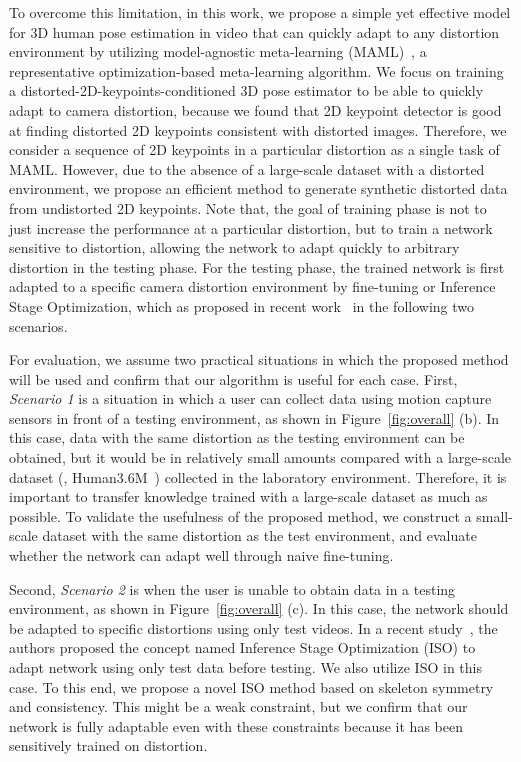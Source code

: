     To overcome this limitation, in this work, we propose a simple yet effective model for 3D human pose estimation in video that can quickly adapt to any distortion environment by utilizing model-agnostic meta-learning (MAML)~\cite{ref20_pmlr-v70-finn17a}, a representative optimization-based meta-learning algorithm. We focus on training a distorted-2D-keypoints-conditioned 3D pose estimator to be able to quickly adapt to camera distortion, because we found that 2D keypoint detector is good at finding distorted 2D keypoints consistent with distorted images. Therefore, we consider a sequence of 2D keypoints in a particular distortion as a single task of MAML. However, due to the absence of a large-scale dataset with a distorted environment, we propose an efficient method to generate synthetic distorted data from undistorted 2D keypoints. Note that, the goal of training phase is not to just increase the performance at a particular distortion, but to train a network sensitive to distortion, allowing the network to adapt quickly to arbitrary distortion in the testing phase. For the testing phase, the trained network is first adapted to a specific camera distortion environment by fine-tuning or Inference Stage Optimization, which as proposed in recent work~\cite{ref18_ISO_NeurIPS2020} in the following two scenarios.

    For evaluation, we assume two practical situations in which the proposed method will be used and confirm that our algorithm is useful for each case. First, \textit{Scenario 1} is a situation in which a user can collect data using motion capture sensors in front of a testing environment, as shown in Figure~\ref{fig:overall} (b). In this case, data with the same distortion as the testing environment can be obtained, but it would be in relatively small amounts compared with a large-scale dataset (\eg, Human3.6M~\cite{ref19_6682899}) collected in the laboratory environment. Therefore, it is important to transfer knowledge trained with a large-scale dataset as much as possible. To validate the usefulness of the proposed method, we construct a small-scale dataset with the same distortion as the test environment, and evaluate whether the network can adapt well through naive fine-tuning.

    Second, \textit{Scenario 2} is when the user is unable to obtain data in a testing environment, as shown in Figure~\ref{fig:overall} (c). In this case, the network should be adapted to specific distortions using only test videos. In a recent study~\cite{ref18_ISO_NeurIPS2020}, the authors proposed the concept named Inference Stage Optimization (ISO) to adapt network using only test data before testing. We also utilize ISO in this case. To this end, we propose a novel ISO method based on skeleton symmetry and consistency. This might be a weak constraint, but we confirm that our network is fully adaptable even with these constraints because it has been sensitively trained on distortion.


